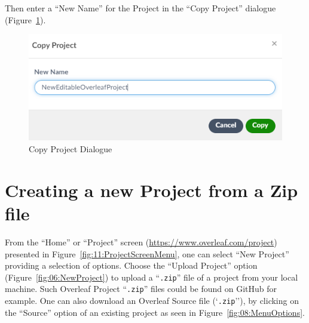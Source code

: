 \documentclass[12pt]{article}
\begin{document}
Then enter a ``New Name'' for the Project in the ``Copy Project'' dialogue (Figure~\ref{fig:10:CopyProjectDialogue}).

\begin{figure}[H]
\begin{center}
\includegraphics[width=.75\linewidth]{10-CopyProject-Rename.png}
\caption{Copy Project Dialogue} \label{fig:10:CopyProjectDialogue}
\end{center}
\end{figure}

\clearpage
\section{Creating a new Project from a Zip file}
From the ``Home'' or ``Project'' screen (\url{https://www.overleaf.com/project}) presented in Figure~\ref{fig:11:ProjectScreenMenu}, one can select ``New Project'' providing a selection of options. Choose the ``Upload Project'' option (Figure~\ref{fig:06:NewProject}) to upload a ``{\tt .zip}'' file of a project from your local machine. Such Overleaf Project ``{\tt .zip}'' files could be found on GitHub for example. One can also download an Overleaf Source file (`{\tt .zip}''), by clicking on the ``Source'' option of an existing project as seen in Figure~\ref{fig:08:MenuOptions}.
\end{document}
